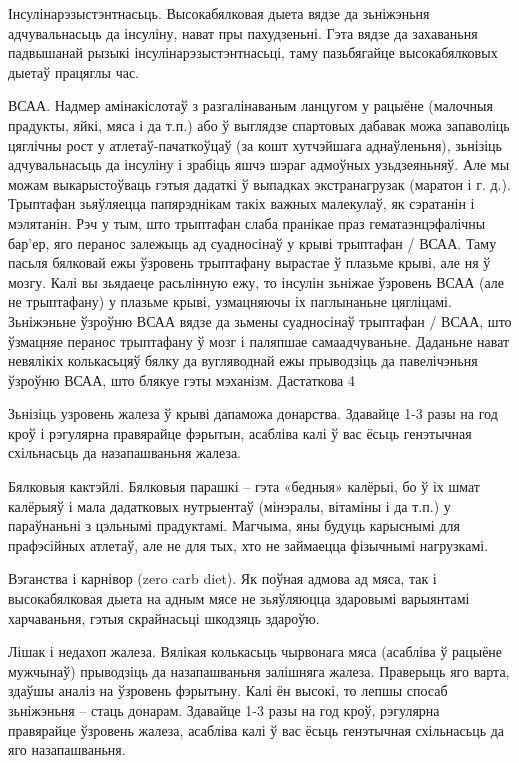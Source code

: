 Інсулінарэзыстэнтнасьць.
Высокабялковая дыета вядзе да зьніжэньня адчувальнасьць да інсуліну, нават пры пахудзеньні. Гэта вядзе да захаваньня падвышанай рызыкі інсулінарэзыстэнтнасьці, таму пазьбягайце высокабялковых дыетаў працяглы час.

ВСАА.
Надмер амінакіслотаў з разгалінаваным ланцугом у рацыёне (малочныя прадукты, яйкі, мяса і да т.п.) або ў выглядзе спартовых дабавак можа запаволіць цяглічны рост у атлетаў-пачаткоўцаў (за кошт хутчэйшага аднаўленьня), зьнізіць адчувальнасьць да інсуліну і зрабіць яшчэ шэраг адмоўных узьдзеяньняў. Але мы можам выкарыстоўваць гэтыя дадаткі ў выпадках экстранагрузак (маратон і г. д.). Трыптафан зьяўляецца папярэднікам такіх важных малекулаў, як сэратанін і мэлятанін. Рэч у тым, што трыптафан слаба пранікае праз гематаэнцэфалічны бар'ер, яго перанос залежыць ад суадносінаў у крыві трыптафан / ВСАА. Таму пасьля бялковай ежы ўзровень трыптафану вырастае ў плазьме крыві, але ня ў мозгу. Калі вы зьядаеце расьлінную ежу, то інсулін зьніжае ўзровень ВСАА (але не трыптафану) у плазьме крыві, узмацняючы іх паглынаньне цягліцамі. Зьніжэньне ўзроўню ВСАА вядзе да зьмены суадносінаў трыптафан / ВСАА, што ўзмацняе перанос трыптафану ў мозг і паляпшае самаадчуваньне. Даданьне нават невялікіх колькасьцяў бялку да вугляводнай ежы прыводзіць да павелічэньня ўзроўню ВСАА, што блякуе гэты мэханізм. Дастаткова 4%

Зьнізіць узровень жалеза ў крыві дапаможа донарства. Здавайце 1-3 разы на год кроў і рэгулярна правярайце фэрытын, асабліва калі ў вас ёсьць генэтычная схільнасьць да назапашваньня жалеза.

Бялковыя кактэйлі.
Бялковыя парашкі – гэта «бедныя» калёрыі, бо ў іх шмат калёрыяў і мала дадатковых нутрыентаў (мінэралы, вітаміны і да т.п.) у параўнаньні з цэльнымі прадуктамі. Магчыма, яны будуць карыснымі для прафэсійных атлетаў, але не для тых, хто не займаецца фізычнымі нагрузкамі.

Вэганства і карнівор (zero carb diet).
Як поўная адмова ад мяса, так і высокабялковая дыета на адным мясе не зьяўляюцца здаровымі варыянтамі харчаваньня, гэтыя скрайнасьці шкодзяць здароўю.

Лішак і недахоп жалеза.
Вялікая колькасьць чырвонага мяса (асабліва ў рацыёне мужчынаў) прыводзіць да назапашваньня залішняга жалеза. Праверыць яго варта, здаўшы аналіз на ўзровень фэрытыну. Калі ён высокі, то лепшы спосаб зьніжэньня – стаць донарам. Здавайце 1-3 разы на год кроў, рэгулярна правярайце ўзровень жалеза, асабліва калі ў вас ёсьць генэтычная схільнасьць да яго назапашваньня.

